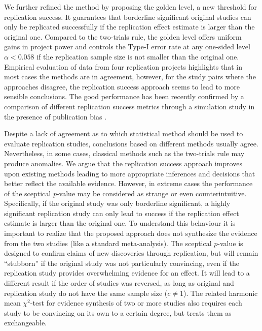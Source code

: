 We further refined the method by proposing the golden level, a new threshold for
replication success. It guarantees that borderline significant original studies
can only be replicated successfully if the replication effect estimate is larger
than the original one. Compared to the two-trials rule, the golden level offers
uniform gains in project power and controls the Type-I error rate at any
one-sided level $\alpha < 0.058$ if the replication sample size
is not smaller than the original one. Empirical evaluation of data from four
replication projects highlights that in most cases the methods are in agreement,
however, for the study pairs where the approaches disagree, the replication
success approach seems to lead to more sensible conclusions. The good
performance has been recently confirmed by a comparison of different replication
success metrics through a simulation study in the presence of publication bias
\citep{Muradchanian2021}.

Despite a lack of agreement as to which statistical method should be used to
evaluate replication studies, conclusions based on different methods usually
agree. Nevertheless, in some cases, classical methods such as the two-trials
rule may produce anomalies. We argue that the replication success approach
improves upon existing methods leading to more appropriate inferences and
decisions that better reflect the available evidence. However, in extreme cases
the performance of the sceptical $p$-value may be considered as strange or even
counterintuitive. Specifically, if the original study was only borderline
significant, a highly significant replication study can only lead to success if
the replication effect estimate is larger than the original one. To understand
this behaviour it is important to realize that the proposed approach does not
synthesize the evidence from the two studies (like a standard meta-analysis).
The sceptical $p$-value is designed to confirm claims of new discoveries through
replication, but will remain ``stubborn'' \citep{Ly2020} if the original study
was not particularly convincing, even if the replication study provides
overwhelming evidence for an effect. It will lead to a different result if the
order of studies was reversed, as long as original and replication study do not
have the same sample size ($c \neq 1$). The related harmonic mean $\chi^2$-test
\citep{Held2020b} for evidence synthesis of two or more studies also requires
each study to be convincing on its own to a certain degree, but treats them as
exchangeable.

